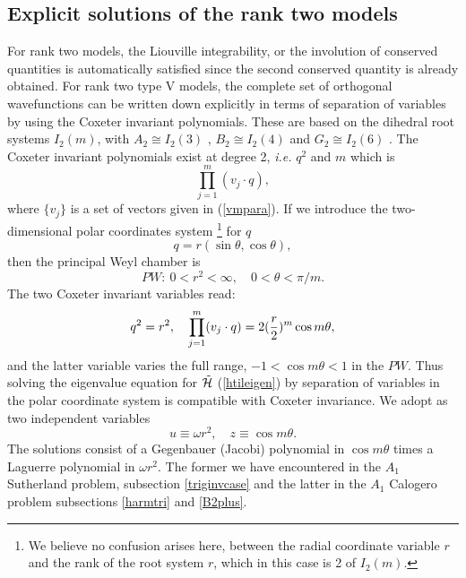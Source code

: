 \documentclass[a4paper,12pt]{article}
\begin{document}
\subsection{Explicit solutions of the rank two models}
\label{ranktwo}
For rank two models, the Liouville integrability, or the involution of
conserved quantities is automatically satisfied since the second conserved
quantity is already obtained.
For rank two type V models, the complete set of orthogonal wavefunctions
can be  written down explicitly in terms of separation of variables by
using the Coxeter invariant polynomials.
These are based on the dihedral root systems \(I_2(m)\), with
\(A_2\cong I_2(3)\) \cite{Cal1},
\(B_2\cong I_2(4)\) and \(G_2\cong I_2(6)\) \cite{G2sep}.
The Coxeter invariant polynomials exist at degree 2, {\em i.e.\/}
\(q^2\) and \(m\)
which is
\begin{equation}
   \prod_{j=1}^m(v_j\cdot q),
\end{equation}
where \(\{v_j\}\) is a set of vectors given in (\ref{vmpara}).
If we introduce the two-dimensional polar coordinates system
\footnote{We believe no confusion arises here, between the radial coordinate
variable \(r\) and the rank of the root system \(r\), which in this case is
2
of \(I_2(m)\).}
for \(q\)
\begin{equation}
   q=r(\sin\theta,\cos\theta),
\end{equation}
then the principal Weyl chamber is
\begin{equation}
   PW:\ 0<r^2<\infty,\quad 0<\theta<\pi/m.
\end{equation}
The two Coxeter invariant variables read:
\begin{equation}
   q^2=r^2,\quad \prod_{j=1}^m(v_j\cdot q)=2({r\over2})^m\cos m\theta,
\end{equation}
and the latter variable varies the full range, \(-1<\cos m\theta<1\)
in the \(PW\).
Thus solving the eigenvalue equation for \(\tilde{\cal H}\)
(\ref{htileigen}) by
separation of variables in the polar coordinate system is
compatible with Coxeter
invariance.
We adopt as two independent variables
\begin{equation}
   u\equiv\omega r^2,\quad z\equiv\cos m\theta.
   \label{coxinvvartwo}
\end{equation}
The solutions consist of a Gegenbauer (Jacobi) polynomial in
\(\cos m\theta\)
times a Laguerre polynomial in \(\omega r^2\).
The former we have encountered in the \(A_1\) Sutherland problem, subsection
\ref{triginvcase} and the latter in the \(A_1\) Calogero problem subsections
\ref{harmtri} and \ref{B2plus}.
\end{document}
